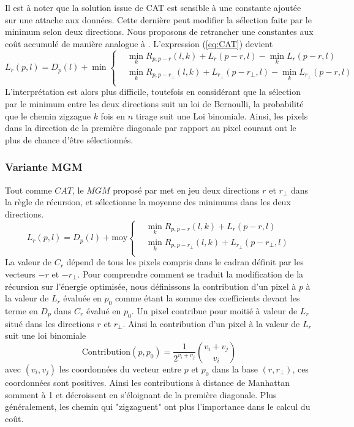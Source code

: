 \documentclass[../main/These_Mathias_Paget.tex]{subfiles}
\begin{document}
Il est à noter que la solution issue de CAT est sensible à une constante ajoutée sur une attache aux données. Cette dernière peut modifier la sélection faite par le minimum selon deux directions. Nous proposons de retrancher une constantes aux coût accumulé de manière analogue à \cite{Hirschmuler}. L'expression (\ref{eq:CAT}) devient
\begin{equation}
	L_r(p,l) = D_{p}(l) + \min{
  \left\{
      \begin{aligned}
      &  \min_{k}{R_{p,p{-}r}(l,k) + L_{r}(p{-}r,l)} - \min_{k}{L_r(p{-}r,l)} \\
      &  \min_{k}{R_{p,p{-}r_{\perp}}(l,k) + L_{r_{\perp}}(p{-}r_{\perp},l)} - \min_{k}{L_{r_{\perp}}(p{-}r,l)} \\
      \end{aligned}
    \right.
    }
\end{equation}
L'interprétation est alors plus difficile, toutefois en considérant que la sélection par le minimum entre les deux directions suit un loi de Bernoulli, la probabilité que le chemin zigzague $k$ fois en $n$ tirage suit une Loi binomiale. Ainsi, les pixels dans la direction de la première diagonale par rapport au pixel courant ont le plus de chance d'être sélectionnés.

\subsubsection{Variante MGM}

Tout comme $CAT$, le $MGM$ proposé par \cite{FaccioloBMVC15} met en jeu deux directions $r$ et $r_{\perp}$ dans la règle de récursion, et sélectionne la moyenne des minimums dans les deux directions. 
\begin{equation}
	L_r(p,l) = D_{p}(l) + \text{moy}{
  \left\{
      \begin{aligned}
      &  \min_{k}{R_{p,p{-}r}(l,k) + L_{r}(p{-}r,l)} \\
      &  \min_{k}{R_{p,p{-}r_{\perp}}(l,k) + L_{r_{\perp}}(p{-}r_{\perp},l)}  \\
      \end{aligned}
    \right.
    }
\end{equation}
La valeur de $C_r$ dépend de tous les pixels compris dans le cadran définit par les vecteurs $-r$ et $-r_{\perp}$. Pour comprendre comment se traduit la modification de la récursion sur l’énergie optimisée, nous définissons la contribution d'un pixel à $p$ à la valeur de $L_r$ évaluée en $p_0$ comme étant la somme des coefficients devant les terme en $D_p$ dans $C_r$ évalué en $p_0$. Un pixel contribue pour moitié à valeur de $L_r$ situé dans les directions $r$ et $r_{\perp}$. Ainsi la contribution d'un pixel à la valeur de $L_r$ suit une loi binomiale
\begin{equation}
	\text{Contribution}(p,p_0) = \frac{1}{2^{v_i + v_j}} \binom{v_i + v_j}{v_i}
\end{equation}
avec $(v_i,v_j)$ les coordonnées du vecteur entre $p$ et $p_0$ dans la base $(r,r_{\perp})$, ces coordonnées sont positives. Ainsi les contributions à distance de Manhattan somment à 1 et décroissent en s’éloignant de la première diagonale. Plus généralement, les chemin qui "zigzaguent" ont plus l'importance dans le calcul du coût.
\end{document}
